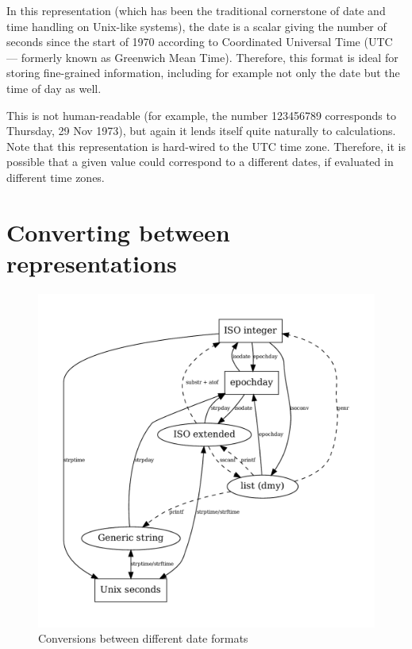 In this representation (which has been the traditional cornerstone of
date and time handling on Unix-like systems), the date is a scalar
giving the number of seconds since the start of 1970 according to
Coordinated Universal Time (UTC --- formerly known as Greenwich Mean
Time). Therefore, this format is ideal for storing fine-grained
information, including for example not only the date but the time of
day as well.

This is not human-readable (for example, the number 123456789
corresponds to Thursday, 29 Nov 1973), but again it lends itself quite
naturally to calculations. Note that this representation is hard-wired
to the UTC time zone. Therefore, it is possible that a given value
could correspond to a different dates, if evaluated in different
time zones.

\section{Converting between representations}
\label{sec:cal-conversions}

\begin{figure}[htbp]
  \centering
  \includegraphics[scale=0.667]{figures/date-conversion}
  \caption{Conversions between different date formats}
  \label{fig:cal-conversions}
\end{figure}

